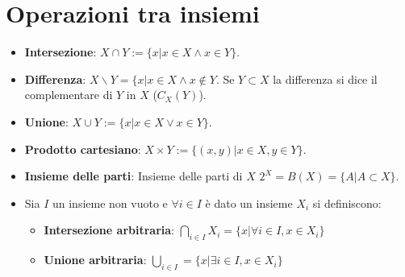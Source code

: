 \section{Operazioni tra insiemi}
\begin{itemize}
\item \textbf{Intersezione}: $X\cap Y :=\{x|x\in X\wedge x\in Y\}$.
\item \textbf{Differenza}: $X\backslash Y=\{x|x\in X\wedge x\not\in Y$. Se $Y\subset X$ la differenza si dice il complementare di $Y$ in $X$ ($C_X(Y)$).
\item \textbf{Unione}: $X\cup Y:=\{x|x\in X\lor x\in Y\}$.
\item \textbf{Prodotto cartesiano}: $X\times Y:=\{(x,y)|x\in X, y\in Y\}$.
\item \textbf{Insieme delle parti}: Insieme delle parti di $X$ $2^X=B(X)=\{A|A\subset X\}$.
\item Sia $I$ un insieme non vuoto e $\forall i\in I$ \`e dato un insieme $X_i$ si definiscono:
\begin{itemize}
\item \textbf{Intersezione arbitraria}: $\bigcap\limits_{i\in I}X_i=\{x|\forall i\in I, x\in X_i\}$
\item \textbf{Unione arbitraria}: $\bigcup\limits_{i\in I}=\{x|\exists i\in I, x\in X_i\}$
\end{itemize} 
\end{itemize}